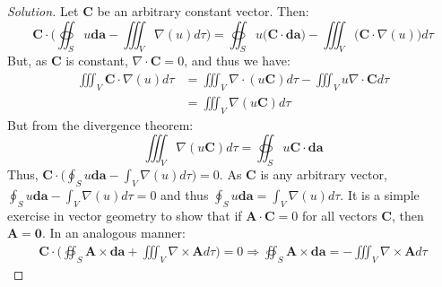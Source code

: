 \documentclass{article}
\theoremstyle{mystyle}
\begin{document}
\begin{proof}[Solution]
Let $\mathbf{C}$ be an arbitrary constant vector. Then:
%
\begin{equation*}
    \mathbf{C}\cdot\bigg(\oiint_{S}u\boldsymbol{da} - \iiint_V \nabla(u)d\tau\bigg) = \oiint_{S} u \bigg(\mathbf{C}\cdot \boldsymbol{da}\bigg) - \iiint_{V} \bigg(\mathbf{C}\cdot \nabla(u)\bigg) d\tau    
\end{equation*}
%
But, as $\mathbf{C}$ is constant, $\nabla \cdot \mathbf{C} = 0$, and thus we have:
%
\begin{align*}
    \iiint_{V} \mathbf{C}\cdot \nabla(u) d\tau &= \iiint_{V} \nabla \cdot (u \mathbf{C}) d\tau - \iiint_{V} u \nabla \cdot \mathbf{C} d\tau\\
    &= \iiint_{V} \nabla(u\mathbf{C}) d\tau    
\end{align*}
But from the divergence theorem:
\begin{equation*}
    \iiint_{V}\nabla(u\mathbf{C}) d\tau = \oiint_{S}u\mathbf{C}\cdot \boldsymbol{da}
\end{equation*} Thus, $\mathbf{C}\cdot\big(\oint_{S}u \boldsymbol{da} - \int_{V} \nabla(u) d\tau \big) = 0$. As $\mathbf{C}$ is any arbitrary vector, $\oint_{S}u \boldsymbol{da} - \int_{V} \nabla(u) d\tau =0$ and thus $\oint_{S} u\boldsymbol{da}= \int_{V} \nabla(u)d\tau$. It is a simple exercise in vector geometry to show that if $\mathbf{A}\cdot \mathbf{C} = 0$ for all vectors $\mathbf{C}$, then $\mathbf{A} = \mathbf{0}$. In an analogous manner:
\begin{align*}
    \mathbf{C}\cdot\bigg(\oiint_{S}\mathbf{A}\times\boldsymbol{da}+\iiint_{V}\nabla\times\mathbf{A}d\tau\bigg)=0\Rightarrow\oiint_{S}\mathbf{A}\times \boldsymbol{da}=-\iiint_{V}\nabla\times\mathbf{A}d\tau
\end{align*}
\end{proof}
\end{document}
